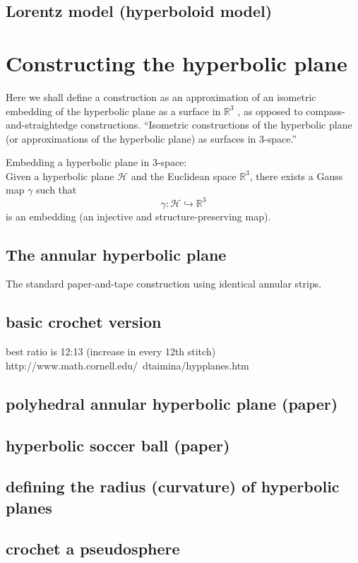 \documentclass{article}
\begin{document}
\subsection{Lorentz model (hyperboloid model)}

\section{Constructing the hyperbolic plane}
Here we shall define a construction as an approximation of an isometric embedding of the hyperbolic plane as a surface in $\mathbb{R}^3$ \cite{crochetplane}, as opposed to compass-and-straightedge constructions.
``Isometric constructions of the hyperbolic plane (or approximations of the hyperbolic plane) as surfaces in 3-space.'' \cite{crochetplane}

Embedding a hyperbolic plane in 3-space:\\
Given a hyperbolic plane $\mathcal{H}$ and the Euclidean space $\mathbb{R}^3$, there exists a Gauss map $\gamma$ such that
\[ \gamma : \mathcal{H} \hookrightarrow \mathbb{R}^3 \]
is an embedding (an injective and structure-preserving map).

\subsection{The annular hyperbolic plane}
The standard paper-and-tape construction using identical annular strips.
\subsection{basic crochet version}
best ratio is 12:13 (increase in every 12th stitch) http://www.math.cornell.edu/~dtaimina/hypplanes.htm
\subsection{polyhedral annular hyperbolic plane (paper)}
\subsection{hyperbolic soccer ball (paper)}
\subsection{defining the radius (curvature) of hyperbolic planes}
\subsection{crochet a pseudosphere}
\end{document}
